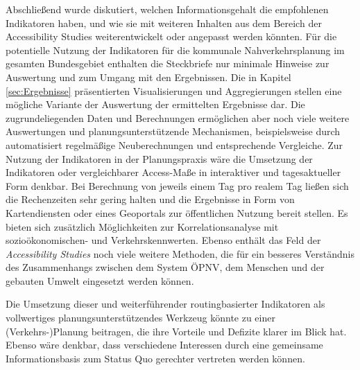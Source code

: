 \documentclass[11pt,pdftex,a4paper]{scrartcl}
\begin{document}
Abschließend wurde diskutiert, welchen Informationsgehalt die empfohlenen Indikatoren haben, und wie sie mit weiteren Inhalten aus dem Bereich der Accessibility Studies weiterentwickelt oder angepasst werden könnten.
Für die potentielle Nutzung der Indikatoren für die kommunale Nahverkehrsplanung im gesamten Bundesgebiet enthalten die Steckbriefe nur minimale Hinweise zur Auswertung und zum Umgang mit den Ergebnissen. Die in Kapitel \ref{sec:Ergebnisse} präsentierten Visualisierungen und Aggregierungen stellen eine mögliche Variante der Auswertung der ermittelten Ergebnisse dar. Die zugrundeliegenden Daten und Berechnungen ermöglichen aber noch viele weitere Auswertungen und planungsunterstützende Mechanismen, beispielsweise durch automatisiert regelmäßige Neuberechnungen und entsprechende Vergleiche. Zur Nutzung der Indikatoren in der Planungspraxis wäre die Umsetzung der Indikatoren oder vergleichbarer Access-Maße in interaktiver und tagesaktueller Form denkbar. Bei Berechnung von jeweils einem Tag pro realem Tag ließen sich die Rechenzeiten sehr gering halten und die Ergebnisse in Form von Kartendiensten oder eines Geoportals zur öffentlichen Nutzung bereit stellen. Es bieten sich zusätzlich Möglichkeiten zur Korrelationsanalyse mit sozioökonomischen- und Verkehrskennwerten. Ebenso enthält das Feld der \textit{Accessibility Studies} noch viele weitere Methoden, die für ein besseres Verständnis des Zusammenhangs zwischen dem System ÖPNV, dem Menschen und der gebauten Umwelt eingesetzt werden können.

Die Umsetzung dieser und weiterführender routingbasierter Indikatoren als vollwertiges planungsunterstützendes Werkzeug könnte zu einer (Verkehrs-)Planung beitragen, die ihre Vorteile und Defizite klarer im Blick hat. Ebenso wäre denkbar, dass verschiedene Interessen durch eine gemeinsame Informationsbasis zum Status Quo gerechter vertreten werden können.
\end{document}
